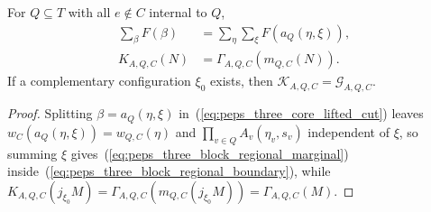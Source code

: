 \begin{lemma}%
    \label{thm:peps_three_block_regional_boundary_exact}
    \leanok
    For $Q\subseteq T$ with all $e\notin C$ internal to $Q$,
    \begin{align}
        \sum_\beta F(\beta) & =\sum_\eta\sum_\xi F(a_Q(\eta,\xi)),\nonumber \\
        K_{A,Q,C}(N)        & =\Gamma_{A,Q,C}(m_{Q,C}(N)).\nonumber
    \end{align}
    If a complementary configuration $\xi_0$ exists, then
    $\mathcal K_{A,Q,C}=\mathcal G_{A,Q,C}$.
\end{lemma}
\begin{proof}\leanok
    Splitting $\beta=a_Q(\eta,\xi)$ in~(\ref{eq:peps_three_core_lifted_cut})
    leaves $w_C(a_Q(\eta,\xi))=w_{Q,C}(\eta)$ and $\prod_{v\in Q}A_v(\eta_v,s_v)$
    independent of $\xi$, so summing $\xi$ gives~(\ref{eq:peps_three_block_regional_marginal})
    inside~(\ref{eq:peps_three_block_regional_boundary}), while
    $K_{A,Q,C}(j_{\xi_0}M)=\Gamma_{A,Q,C}(m_{Q,C}(j_{\xi_0}M))=\Gamma_{A,Q,C}(M)$.
\end{proof}

